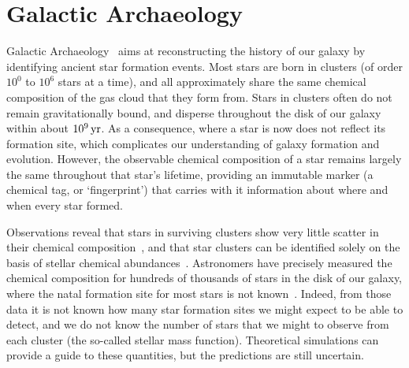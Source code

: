 \documentclass{elsarticle}
\begin{document}
\section{Galactic Archaeology}
Galactic Archaeology~\cite{freeman2002new} aims at reconstructing the history 
of our galaxy by identifying ancient star formation events. Most stars are 
born in clusters (of order $10^0$ to $10^6$ stars at a time), and all approximately
share the same chemical composition of the gas cloud that they form from.
Stars in clusters often do not remain gravitationally bound, and disperse 
throughout the disk of our galaxy within about $10^9\,{\rm yr}$. %
As a consequence, where a star is now does not reflect its formation site, 
which complicates our understanding of galaxy formation and evolution. However, the
observable chemical composition of a star remains largely the same throughout
that star's lifetime, providing an immutable marker (a chemical tag, or
`fingerprint') that carries with it information about where and when every star
formed.


Observations reveal that stars in surviving clusters show very little scatter
in their chemical composition~\cite{pancino2010chemical}, and that star
clusters can be identified solely on the basis of stellar chemical
abundances~\cite{Hogg:2016}. Astronomers have precisely measured the
chemical composition for hundreds of thousands of stars in the disk of our galaxy,
where the natal formation site for most stars is not known~\cite{Buder:2018}.
Indeed, from those data it is not known how many star formation sites we might
expect to be able to detect, and we do not know the number of stars that we
might to observe from each cluster (the so-called stellar mass function).
Theoretical simulations can provide a guide to these quantities, but the
predictions are still uncertain.
\end{document}
